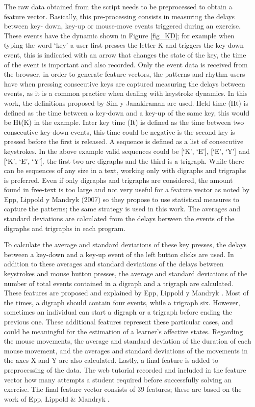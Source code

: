 \documentclass[a4paper,twoside]{article}
\begin{document}
The raw data
obtained from the script needs to be preprocessed to obtain a feature vector.
Basically, this pre-processing consists in measuring the delays between key-
down, key-up or mouse-move events triggered during an exercise. These events
have the dynamic shown in Figure \ref{fig_KD}; for example when typing the word ‘key’ a
user first presses the letter K and triggers the key-down event, this is
indicated with an arrow that changes the state of the key, the time of the event
is important and also recorded. Only the event data is received from the
browser, in order to generate feature vectors, the patterns and rhythm users
have when pressing consecutive keys are captured measuring the delays between
events, as it is a common practice when dealing with keystroke dynamics. In this
work, the definitions proposed by Sim y Janakiraman \cite{sim2007digraphs} are used. Held
time (Ht) is defined as the time between a key-down and a key-up of the same
key, this would be Ht(K) in the example. Inter key time (It) is defined as the
time between two consecutive key-down events, this time could be negative is the
second key is pressed before the first is released. A sequence is defined as a
list of consecutive keystrokes. In the above example valid sequences could be
[‘K’, ‘E’], [‘E’, ‘Y’] and [‘K’, ‘E’, ‘Y’], the first two are digraphs and the
third is a trigraph. While there can be sequences of any size in a text, working
only with digraphs and trigraphs is preferred. Even if only digraphs and
trigraphs are considered, the amount found in free-text is too large and not
very useful for a feature vector as noted by Epp, Lippold y Mandryk (2007) so
they propose to use statistical measures to capture the patterns; the same
strategy is used in this work. The averages and standard deviations are
calculated from the delays between the events of the digraphs and trigraphs in
each program.


To calculate the average and standard deviations of these key presses, the delays
between a key-down and a key-up event of the left button clicks are used. In
addition to these averages and standard deviations of the delays between
keystrokes and mouse button presses, the average and standard deviations of the
number of total events contained in a digraph and a trigraph are calculated.
These features are proposed and explained by Epp, Lippold y Mandryk \cite{epp2011identifying}. Most
of the times, a digraph should contain four events, while a trigraph six.
However, sometimes an individual can start a digraph or a trigraph before ending
the previous one. These additional features represent these particular cases,
and could be meaningful for the estimation of a learner's affective states.
Regarding the mouse movements, the average and standard deviation of the
duration of each mouse movement, and the averages and standard deviations of the
movements in the axes X and Y are also calculated. Lastly, a final feature is
added to preprocessing of the data. The web tutorial recorded  and included in the feature vector how many attempts
a student required before successfully solving an exercise. The final feature vector
consists of 39 features; these are based on the work of Epp, Lippold \& Mandryk
\cite{epp2011identifying}.
\end{document}
